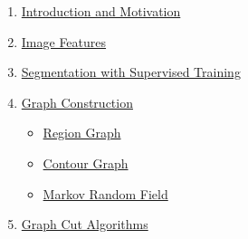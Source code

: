 \documentclass[11pt, a4paper, landscape]{article}
\begin{document}
\TitlePage

\NewPage{}
\vfill
\begin{enumerate}
\item \hyperlink{sli:introduction}{Introduction and Motivation}
\item \hyperlink{sli:features}{Image Features}
\item \hyperlink{sli:supervised}{Segmentation with Supervised Training}
\item \hyperlink{sli:construction}{Graph Construction}
\begin{itemize}
	\item \hyperlink{sli:region_graph}{Region Graph}
	\item \hyperlink{sli:contour_graph}{Contour Graph}
	\item \hyperlink{sli:mrf}{Markov Random Field}
\end{itemize}
\item \hyperlink{sli:algorithms}{Graph Cut Algorithms}

\end{enumerate}
\end{document}
